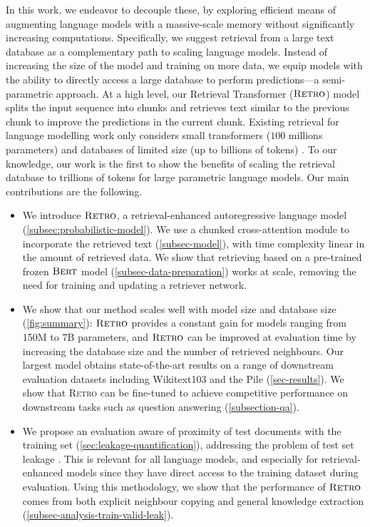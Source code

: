 In this work, we endeavor to decouple these, by exploring efficient means of augmenting language models with a massive-scale memory without significantly increasing computations. Specifically, we suggest retrieval from a large text database as a complementary path to scaling language models. Instead of increasing the size of the model and training on more data, we equip models with the ability to directly access a large database to perform predictions---a semi-parametric approach. At a high level, our Retrieval Transformer ($\textsc{Retro}$) model splits the input sequence into chunks and retrieves text similar to the previous chunk to improve the predictions in the current chunk. Existing retrieval for language modelling work only considers small transformers ($100$ millions parameters) and databases of limited size (up to billions of tokens) \citep{khandelwal2020generalization, yogatama2021adaptive, guu2020retrieval, lewis2020retrieval}. To our knowledge, our work is the first to show the benefits of scaling the retrieval database to trillions of tokens for large parametric language models. Our main contributions are the following.

\begin{itemize}
    \item We introduce $\textsc{Retro}$, a retrieval-enhanced autoregressive language model (\autoref{subsec:probabilistic-model}). We use a chunked cross-attention module to incorporate the retrieved text (\autoref{subsec-model}), with time complexity linear in the amount of retrieved data. We show that retrieving based on a pre-trained frozen $\textsc{Bert}$ model (\autoref{subsec-data-preparation}) works at scale, removing the need for training and updating a retriever network.

    \item We show that our method scales well with model size and database size (\autoref{fig:summary}): $\textsc{Retro}$ provides a constant gain for models ranging from 150M to 7B parameters, and $\textsc{Retro}$ can be improved at evaluation time by increasing the database size and the number of retrieved neighbours. Our largest model obtains state-of-the-art results on a range of downstream evaluation datasets including Wikitext103 \citep{merity2016pointer} and the Pile \citep{pile} (\autoref{sec-results}). We show that \textsc{Retro} can be fine-tuned to achieve competitive performance on downstream tasks such as question answering (\autoref{subsection-qa}).

    \item We propose an evaluation aware of proximity of test documents with the training set (\autoref{sec:leakage-quantification}), addressing the problem of test set leakage \citep{lee2021deduplicating}. This is relevant for all language models, and especially for retrieval-enhanced models since they have direct access to the training dataset during evaluation. Using this methodology, we show that the performance of $\textsc{Retro}$ comes from both explicit neighbour copying and general knowledge extraction (\autoref{subsec-analysis-train-valid-leak}).
\end{itemize}

